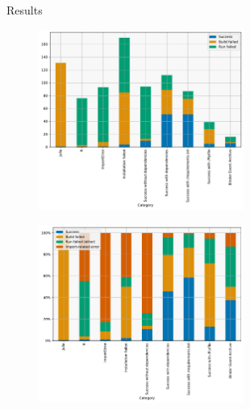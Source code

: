 \documentclass{beamer}
\begin{document}
\begin{frame}[fragile]
\begin{columns}[T]
\begin{column}{.4\textwidth}
\begin{block}{Results}



\begin{figure}%
    \includegraphics[width=0.6\textwidth]{fig/totals.pdf}
\end{figure}

\begin{figure}%
    \includegraphics[width=0.6\textwidth]{fig/rates.pdf}
\end{figure}


\end{block}
\end{column}
\end{columns}
\end{frame}
\end{document}
